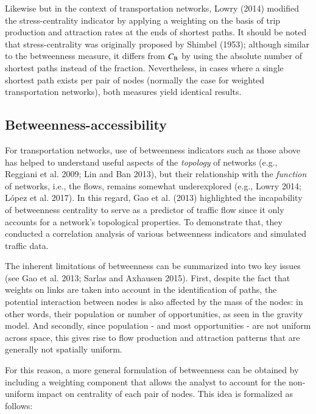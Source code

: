 \documentclass[]{elsarticle} %
\begin{document}
Likewise but in the context of transportation networks, Lowry (2014)
modified the stress-centrality indicator by applying a weighting on the
basis of trip production and attraction rates at the ends of shortest
paths. It should be noted that stress-centrality was originally proposed
by Shimbel (1953); although similar to the betweenness measure, it
differs from \(C_{\rm B}\) by using the absolute number of shortest
paths instead of the fraction. Nevertheless, in cases where a single
shortest path exists per pair of nodes (normally the case for weighted
transportation networks), both measures yield identical results.

\hypertarget{betweenness-accessibility}{%
\subsection{Betweenness-accessibility}\label{betweenness-accessibility}}

For transportation networks, use of betweenness indicators such as those
above has helped to understand useful aspects of the \emph{topology} of
networks (e.g., Reggiani et al. 2009; Lin and Ban 2013), but their
relationship with the \emph{function} of networks, i.e., the flows,
remains somewhat underexplored (e.g., Lowry 2014; López et al. 2017). In
this regard, Gao et al. (2013) highlighted the incapability of
betweenness centrality to serve as a predictor of traffic flow since it
only accounts for a network's topological properties. To demonstrate
that, they conducted a correlation analysis of various betweenness
indicators and simulated traffic data.

The inherent limitations of betweenness can be summarized into two key
issues (see Gao et al. 2013; Sarlas and Axhausen 2015). First, despite
the fact that weights on links are taken into account in the
identification of paths, the potential interaction between nodes is also
affected by the mass of the nodes: in other words, their population or
number of opportunities, as seen in the gravity model. And secondly,
since population - and most opportunities - are not uniform across
space, this gives rise to flow production and attraction patterns that
are generally not spatially uniform.

For this reason, a more general formulation of betweenness can be
obtained by including a weighting component that allows the analyst to
account for the non-uniform impact on centrality of each pair of nodes.
This idea is formalized as follows:
\end{document}
